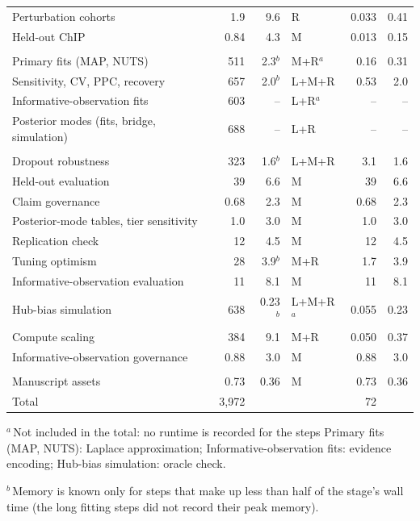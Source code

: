 \begin{table}[tbp]
\begin{tabular}{@{}lrrlrr@{}}
Perturbation cohorts & 1.9 & 9.6 & R & 0.033 & 0.41 \\
Held-out ChIP & 0.84 & 4.3 & M & 0.013 & 0.15 \\
\addlinespace[3pt]
\multicolumn{6}{@{}l}{\emph{Model layer}} \\
Primary fits (MAP, NUTS) & 511 & 2.3$^{b}$ & M+R$^{a}$ & 0.16 & 0.31 \\
Sensitivity, CV, PPC, recovery & 657 & 2.0$^{b}$ & L+M+R & 0.53 & 2.0 \\
Informative-observation fits & 603 & -- & L+R$^{a}$ & -- & -- \\
Posterior modes (fits, bridge, simulation) & 688 & -- & L+R & -- & -- \\
\addlinespace[3pt]
\multicolumn{6}{@{}l}{\emph{Evaluation}} \\
Dropout robustness & 323 & 1.6$^{b}$ & L+M+R & 3.1 & 1.6 \\
Held-out evaluation & 39 & 6.6 & M & 39 & 6.6 \\
Claim governance & 0.68 & 2.3 & M & 0.68 & 2.3 \\
Posterior-mode tables, tier sensitivity & 1.0 & 3.0 & M & 1.0 & 3.0 \\
Replication check & 12 & 4.5 & M & 12 & 4.5 \\
Tuning optimism & 28 & 3.9$^{b}$ & M+R & 1.7 & 3.9 \\
Informative-observation evaluation & 11 & 8.1 & M & 11 & 8.1 \\
Hub-bias simulation & 638 & 0.23$^{b}$ & L+M+R$^{a}$ & 0.055 & 0.23 \\
Compute scaling & 384 & 9.1 & M+R & 0.050 & 0.37 \\
Informative-observation governance & 0.88 & 3.0 & M & 0.88 & 3.0 \\
\addlinespace[3pt]
\multicolumn{6}{@{}l}{\emph{Assets}} \\
Manuscript assets & 0.73 & 0.36 & M & 0.73 & 0.36 \\
\midrule
Total & 3{,}972 &  &  & 72 &  \\
\bottomrule
\end{tabular}
\par\smallskip
\begin{minipage}{\linewidth}\footnotesize
$^{a}$\,Not included in the total: no runtime is recorded for the steps Primary fits (MAP, NUTS): Laplace approximation; Informative-observation fits: evidence encoding; Hub-bias simulation: oracle check.

$^{b}$\,Memory is known only for steps that make up less than half of the stage's wall time (the long fitting steps did not record their peak memory).


\end{minipage}
\end{table}
